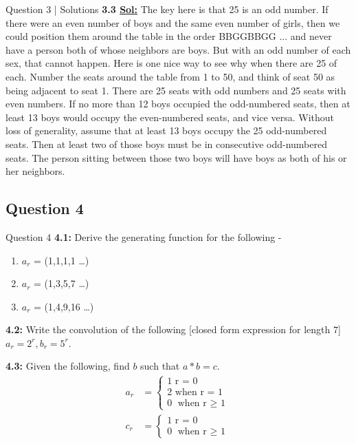 \documentclass[xcolor=svgnames]{beamer}
\begin{document}
\begin{frame}{Question 3 | Solutions}
    \textbf{3.3 \underline{Sol:}} The key here is that 25 is an odd number. If there were an even number of boys and the same even number of girls, then we could position them around the table in the order BBGGBBGG ... and never have a person both of whose neighbors are boys. But with an odd number of each sex, that cannot happen. Here is one nice way to see why when there are 25 of each. Number the seats around the table from 1 to 50, and think of seat 50 as being adjacent to seat 1. There are 25 seats with odd numbers and 25 seats with even numbers. If no more than 12 boys occupied the odd-numbered seats, then at least 13 boys would occupy the even-numbered seats, and vice versa. Without loss of generality, assume that at least 13 boys occupy the 25 odd-numbered seats. Then at least two of those boys must be in consecutive odd-numbered seats. The person sitting between those two boys will have boys as both of his or her neighbors.
\end{frame}

\subsection{Question 4}

\begin{frame}{Question 4}
    \textbf{4.1:} Derive the generating function for the following - 
    \begin{enumerate}
        \item $a_r$ = (1,1,1,1 \ldots)
        \item $a_r$ = (1,3,5,7 \ldots)
        \item $a_r$ = (1,4,9,16 \ldots)
    \end{enumerate}
    \textbf{4.2:} Write the convolution of the following [closed form expression for length $7$] $a_r = 2^r, b_r = 5^r$.

     \textbf{4.3:} Given the following, find $b$ such that $a*b=c$.
        \begin{align*}
        a_r &= \begin{cases}
        1 \text{ r = 0}
        \\ 2 \text{ when r = 1}
        \\ 0 \text{ when r $\geq$  1}
        \end{cases}
              \\ c_r &= \begin{cases}
        1 \text{ r = 0}
        \\ 0 \text{ when r $\geq$  1}
        \end{cases}
        \end{align*}
\end{frame}
\end{document}
